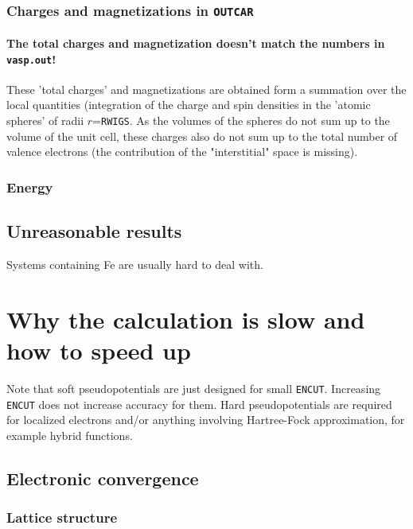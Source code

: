 \documentclass[hyperref, a4paper]{article}
\begin{document}
\subsubsection{Charges and magnetizations in \texttt{OUTCAR}}

\paragraph{The total charges and magnetization doesn't match the numbers in \texttt{vasp.out}!}

These 'total charges' and magnetizations are obtained form a summation over the local quantities (integration of the charge and spin densities in the 'atomic spheres' of radii $r$=\texttt{RWIGS}. 
As the volumes of the spheres do not sum up to the volume of the unit cell, these charges also do not sum up to the total number of valence electrons (the contribution of the "interstitial" space is missing).

\subsubsection{Energy}

\subsection{Unreasonable results}

Systems containing Fe are usually hard to deal with.

\section{Why the calculation is slow and how to speed up}

Note that soft pseudopotentials are just designed for small \texttt{ENCUT}. Increasing \texttt{ENCUT} does not increase accuracy for them.
Hard pseudopotentials are required for localized electrons and/or anything involving Hartree-Fock approximation, for example hybrid functions.

\subsection{Electronic convergence}

\subsubsection{Lattice structure}
\end{document}

